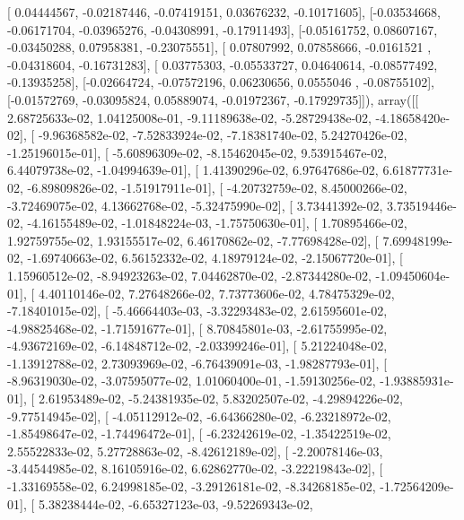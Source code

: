 \documentclass{article}
\begin{document}
       [ 0.04444567, -0.02187446, -0.07419151,  0.03676232, -0.10171605],
       [-0.03534668, -0.06171704, -0.03965276, -0.04308991, -0.17911493],
       [-0.05161752,  0.08607167, -0.03450288,  0.07958381, -0.23075551],
       [ 0.07807992,  0.07858666, -0.0161521 , -0.04318604, -0.16731283],
       [ 0.03775303, -0.05533727,  0.04640614, -0.08577492, -0.13935258],
       [-0.02664724, -0.07572196,  0.06230656,  0.0555046 , -0.08755102],
       [-0.01572769, -0.03095824,  0.05889074, -0.01972367, -0.17929735]]), array([[  2.68725633e-02,   1.04125008e-01,  -9.11189638e-02,
         -5.28729438e-02,  -4.18658420e-02],
       [ -9.96368582e-02,  -7.52833924e-02,  -7.18381740e-02,
          5.24270426e-02,  -1.25196015e-01],
       [ -5.60896309e-02,  -8.15462045e-02,   9.53915467e-02,
          6.44079738e-02,  -1.04994639e-01],
       [  1.41390296e-02,   6.97647686e-02,   6.61877731e-02,
         -6.89809826e-02,  -1.51917911e-01],
       [ -4.20732759e-02,   8.45000266e-02,  -3.72469075e-02,
          4.13662768e-02,  -5.32475990e-02],
       [  3.73441392e-02,   3.73519446e-02,  -4.16155489e-02,
         -1.01848224e-03,  -1.75750630e-01],
       [  1.70895466e-02,   1.92759755e-02,   1.93155517e-02,
          6.46170862e-02,  -7.77698428e-02],
       [  7.69948199e-02,  -1.69740663e-02,   6.56152332e-02,
          4.18979124e-02,  -2.15067720e-01],
       [  1.15960512e-02,  -8.94923263e-02,   7.04462870e-02,
         -2.87344280e-02,  -1.09450604e-01],
       [  4.40110146e-02,   7.27648266e-02,   7.73773606e-02,
          4.78475329e-02,  -7.18401015e-02],
       [ -5.46664403e-03,  -3.32293483e-02,   2.61595601e-02,
         -4.98825468e-02,  -1.71591677e-01],
       [  8.70845801e-03,  -2.61755995e-02,  -4.93672169e-02,
         -6.14848712e-02,  -2.03399246e-01],
       [  5.21224048e-02,  -1.13912788e-02,   2.73093969e-02,
         -6.76439091e-03,  -1.98287793e-01],
       [ -8.96319030e-02,  -3.07595077e-02,   1.01060400e-01,
         -1.59130256e-02,  -1.93885931e-01],
       [  2.61953489e-02,  -5.24381935e-02,   5.83202507e-02,
         -4.29894226e-02,  -9.77514945e-02],
       [ -4.05112912e-02,  -6.64366280e-02,  -6.23218972e-02,
         -1.85498647e-02,  -1.74496472e-01],
       [ -6.23242619e-02,  -1.35422519e-02,   2.55522833e-02,
          5.27728863e-02,  -8.42612189e-02],
       [ -2.20078146e-03,  -3.44544985e-02,   8.16105916e-02,
          6.62862770e-02,  -3.22219843e-02],
       [ -1.33169558e-02,   6.24998185e-02,  -3.29126181e-02,
         -8.34268185e-02,  -1.72564209e-01],
       [  5.38238444e-02,  -6.65327123e-03,  -9.52269343e-02,
\end{document}
